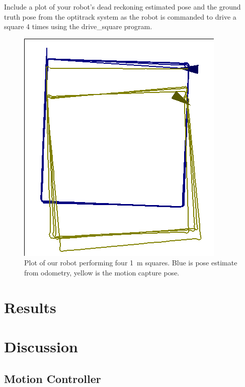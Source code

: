 \documentclass[journal]{IEEEtran}
\begin{document}
Include a plot of your robot’s dead reckoning estimated pose and the ground truth pose from the optitrack system as the robot is commanded to drive a square 4 times using the drive\_square program.

\begin{figure}[b]
    \centering
    \includegraphics[width=1\linewidth]{odometry4.png}
    \caption{Plot of our robot performing four \SI{1}{\meter} squares. Blue is pose estimate from odometry, yellow is the motion capture pose.}
    \label{fig:odometry_squares}
\end{figure}

\section{Results}

\section{Discussion}

\subsection{Motion Controller}
\end{document}

